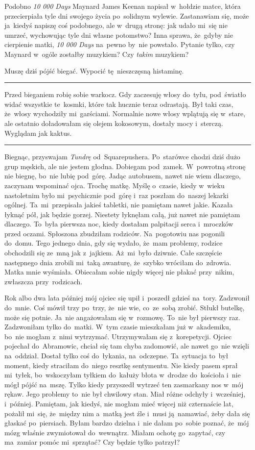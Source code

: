 \documentclass[9pt, a5paper]{memoir}
\begin{document}
Podobno \textit{10 000 Days} Maynard James Keenan napisał w~hołdzie matce, która przecierpiała tyle dni swojego życia po~solidnym wylewie. Zastanawiam się, może ja~kiedyś napiszę coś podobnego, ale w~drugą stronę: jak udało mi~się nie umrzeć, wychowując tyle dni własne potomstwo? Inna sprawa, że~gdyby nie cierpienie matki, \textit{10 000 Days} na~pewno by~nie powstało. Pytanie tylko, czy Maynard w~ogóle zostałby muzykiem? Czy \textit{takim} muzykiem?

Muszę dziś pójść biegać. Wypocić tę~nieszczęsną histaminę.

\fancybreak{* \quad * \quad *}

Przed bieganiem robię sobie warkocz. Gdy zaczesuję włosy do~tyłu, pod~światło widać wszystkie te~kosmki, które tak hucznie teraz odrastają. Był taki czas, że~włosy wychodziły mi~garściami. Normalnie nowe włosy wplątują się w~stare, ale ostatnio doładowałam się olejem kokosowym, dostały mocy i~sterczą. Wyglądam jak kaktus.

\fancybreak{* \quad * \quad *}

Biegnąc, przyswajam \textit{Tundrę} od~Squarepushera. Po~starówce chodzi dziś dużo grup męskich, ale nie jestem głodna. Dobiegam pod~zamek. W~powrotną stronę nie biegnę, bo~nie lubię pod~górę. Jadąc autobusem, nawet nie wiem dlaczego, zaczynam wspominać ojca. Trochę matkę. Myślę o~czasie, kiedy w~wieku nastoletnim było mi~psychicznie pod~górę i~raz poszłam do~naszej lekarki ogólnej. Ta~mi~przepisała jakieś tabletki, nie pamiętam nawet jakie. Kazała łyknąć pół, jak będzie gorzej. Niestety łyknęłam całą, już nawet nie pamiętam dlaczego. To~była pierwsza noc, kiedy dostałam palpitacji serca i~mroczków przed oczami. Spłoszona zbudziłam rodziców. Na~pogotowiu nas pogonili do~domu. Tego jednego dnia, gdy się wydało, że~mam problemy, rodzice obchodzili się ze~mną jak z~jajkiem. Aż~mi~było dziwnie. Całe szczęście następnego dnia zrobili mi~taką awanturę, że~szybko wróciłam do~zdrowia. Matka mnie wyśmiała. Obiecałam sobie nigdy więcej nie płakać przy~nikim, zwłaszcza przy~rodzicach.

Rok albo dwa lata później mój ojciec się upił i~poszedł gdzieś na~tory. Zadzwonił do~mnie. Coś mówił trzy po~trzy, że~nie wie, co~ze~sobą zrobić. Stłukł butelkę, może się potnie. Ja~nie angażowałam się w~rozmowę. To~nie był pierwszy raz. Zadzwoniłam tylko do~matki. W~tym czasie mieszkałam już w~akademiku, bo~nie mogłam z~nimi wytrzymać. Utrzymywałam się z~korepetycji. Ojciec pojechał do~Abramowic, chciał się tam chyba zadomowić, ale nawet go~nie wzięli na~oddział. Dostał tylko coś do~łykania, na~odczepne. Ta~sytuacja to~był moment, kiedy straciłam do~niego resztkę sentymentu. Nie kiedy pasem sprał mi~tyłek, bo~wskoczyłam tyłkiem do~kałuży błota w~drodze do~kościoła i~nie mógł pójść na~mszę. Tylko kiedy przyszedł wytrzeć ten zasmarkany nos w~mój rękaw. Jego problemy to~nie był chwilowy stan. Miał różne odchyły i~wcześniej, i~później. Pamiętam, jak kiedyś, nie mogłam mieć więcej niż czternaście lat, pożalił mi~się, że~między nim a~matką jest źle i~musi ją~namawiać, żeby dała się głaskać po~piersiach. Byłam bardzo dzielna i~nie dałam po~sobie poznać, że~mój mózg właśnie zwymiotował do~wewnątrz. Miałam ochotę go~zapytać, czy ma~zamiar pomóc mi~sprzątać? Czy będzie tylko patrzył?
\end{document}
